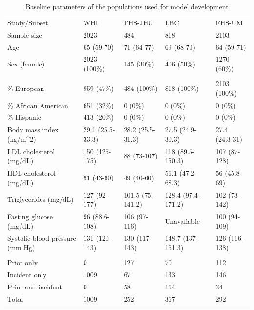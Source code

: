 \documentclass[]{article}
\begin{document}
\begin{table}

\caption{\label{tab:pop-description}Baseline parameters of the populations used for model development}
\centering
\begin{threeparttable}
\begin{tabular}[t]{lllll}
\toprule
Study/Subset & WHI & FHS-JHU & LBC & FHS-UM\\
Sample size & 2023 & 484 & 818 & 2103\\
Age & 65 (59-70) & 71 (64-77) & 69 (68-70) & 64 (59-71)\\
Sex (female) & 2023 (100\%) & 145 (30\%) & 406 (50\%) & 1270 (60\%)\\
\addlinespace[0em]
\multicolumn{5}{l}{Ancestry}\\
\hspace{1em}\% European & 959 (47\%) & 484 (100\%) & 818 (100\%) & 2103 (100\%)\\
\hspace{1em}\% African American & 651 (32\%) & 0 (0\%) & 0 (0\%) & 0 (0\%)\\
\hspace{1em}\% Hispanic & 413 (20\%) & 0 (0\%) & 0 (0\%) & 0 (0\%)\\
Body mass index (kg/m\textasciicircum{}2) & 29.1 (25.5-33.3) & 28.2 (25.5-31.3) & 27.5 (24.9-30.3) & 27.4 (24.3-31)\\
LDL cholesterol (mg/dL) & 150 (126-175) & 88 (73-107) & 118 (89.5-150.3) & 107 (87-128)\\
HDL cholesterol (mg/dL) & 51 (43-60) & 49 (40-60) & 56.1 (47.2-68.3) & 56 (45.8-69)\\
Triglycerides (mg/dL) & 127 (92-177) & 101.5 (75-141.2) & 128.4 (97.4-171.2) & 102 (73-142)\\
Fasting glucose (mg/dL) & 96 (88.6-108) & 106 (97-116) & Unavailable & 100 (94-109)\\
Systolic blood pressure (mm Hg) & 131 (120-143) & 130 (117-143) & 148.7 (137-161.3) & 126 (116-138)\\
\addlinespace[0em]
\multicolumn{5}{l}{\# CVD events}\\
\hspace{1em}Prior only & 0 & 127 & 70 & 112\\
\hspace{1em}Incident only & 1009 & 67 & 133 & 146\\
\hspace{1em}Prior and incident & 0 & 58 & 164 & 34\\
\hspace{1em}Total & 1009 & 252 & 367 & 292\\

\end{tabular}
\end{threeparttable}
\end{table}
\end{document}
